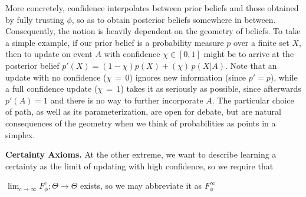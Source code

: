 More concretely, confidence interpolates between prior beliefs and those obtained by fully trusting $\phi$, so as to obtain posterior beliefs somewhere in between. 
Consequently, the notion is heavily dependent on the geometry of beliefs.
To take a simple example,
if our prior belief is a probability measure $p$ over a finite set $X$, then to update on event $A$ with confidence $\chi \in [0,1]$ might be to arrive at the posterior belief $p'(X) = (1-\chi) p(X) + (\chi)\, p(X|A)$. 
Note that 
an update with no confidence ($\chi{\,=\,}0$) ignores new information (since $p' \!=\! p$),
while a
full confidence update ($\chi{\,=\,}1$) takes it as seriously as possible,
since afterwards $p'(A) \!=\! 1$ and there is no way to further incorporate $A$.
%
%
The particular choice of path, as well as its parameterization,
are open for debate, but are natural consequences of the geometry when we think of probabilities as points in a simplex.




\textbf{Certainty Axioms.}
    At the other extreme, we want to describe learning a certainty as the limit of updating with high confidence, so we require that
    \begin{CFaxioms}
        \item
            $\displaystyle\lim_{c \to \infty} F^{c}_\phi : \Theta \to \bar\Theta$
            exists, so we may abbreviate it as $F^\infty_\phi$
            \label{ax:cert-exists}
    \end{CFaxioms}

